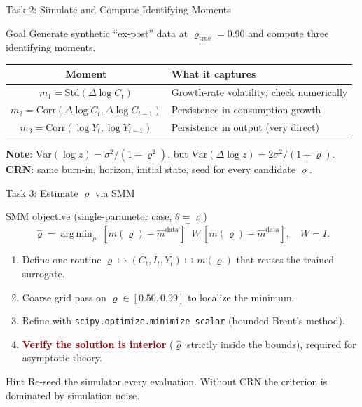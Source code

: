\documentclass[10pt,aspectratio=169]{beamer}
\newcommand{\emphc}[1]{\textbf{\textcolor{darkred}{#1}}}
\DeclareMathOperator*{\argmin}{arg\,min}
\begin{document}
\begin{frame}{Task 2: Simulate and Compute Identifying Moments}
\begin{block}{Goal}
Generate synthetic ``ex-post'' data at $\varrho_{\text{true}} = 0.90$ and compute three identifying moments.
\end{block}
\begin{center}\small
\begin{tabular}{cl}
\toprule
\textbf{Moment} & \textbf{What it captures} \\
\midrule
$m_1 = \mathrm{Std}(\Delta\log C_t)$               & Growth-rate volatility; check numerically \\
$m_2 = \mathrm{Corr}(\Delta\log C_t, \Delta\log C_{t-1})$ & Persistence in consumption growth \\
$m_3 = \mathrm{Corr}(\log Y_t, \log Y_{t-1})$       & Persistence in output (very direct) \\
\bottomrule
\end{tabular}\end{center}
\vspace{0.15cm}
\textbf{Note}: $\mathrm{Var}(\log z)=\sigma^2/(1-\varrho^2)$, but $\mathrm{Var}(\Delta\log z)=2\sigma^2/(1+\varrho)$.\\[2pt]
\textbf{CRN}: same burn-in, horizon, initial state, seed for every candidate $\varrho$.
\end{frame}

\begin{frame}{Task 3: Estimate $\varrho$ via SMM}
\begin{block}{SMM objective (single-parameter case, $\theta = \varrho$)}
\vspace{-4pt}
\[\hat\varrho = \argmin_{\varrho}\; [m(\varrho) - \hat{m}^{\mathrm{data}}]^\top W \,[m(\varrho) - \hat{m}^{\mathrm{data}}], \quad W = I.\]
\vspace{-12pt}
\end{block}
\begin{enumerate}
  \item Define one routine $\varrho \mapsto (C_t, I_t, Y_t) \mapsto m(\varrho)$ that reuses the trained surrogate.
  \item Coarse grid pass on $\varrho \in [0.50, 0.99]$ to localize the minimum.
  \item Refine with \texttt{scipy.optimize.minimize\_scalar} (bounded Brent's method).
  \item \emphc{Verify the solution is interior} ($\hat\varrho$ strictly inside the bounds), required for asymptotic theory.
\end{enumerate}
\begin{alertblock}{Hint}
Re-seed the simulator every evaluation. Without CRN the criterion is dominated by simulation noise.
\end{alertblock}
\end{frame}
\end{document}
